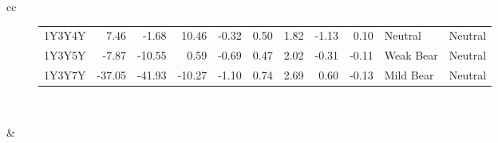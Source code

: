 \documentclass[a4paper,twoside]{report}
\begin{document}
\begin{figure}[htbp]
\begin{tabular}[c]{cc}
\begin{subfigure}[c]{0.5\textwidth}
\begin{adjustbox}{max width=\textwidth}
\begin{tabular}{lrrrrrrrrll}
       1Y3Y4Y &    7.46 &    -1.68 &     10.46 &  -0.32 &  0.50 &      1.82 &  -1.13 &     0.10 &      Neutral &         Neutral \\
       1Y3Y5Y &   -7.87 &   -10.55 &      0.59 &  -0.69 &  0.47 &      2.02 &  -0.31 &    -0.11 &    Weak Bear &         Neutral \\
       1Y3Y7Y &  -37.05 &   -41.93 &    -10.27 &  -1.10 &  0.74 &      2.69 &   0.60 &    -0.13 &    Mild Bear &         Neutral \\
\hline
\end{tabular}
\end{adjustbox}
\end{subfigure}\\
 
 

\begin{subfigure}[c]{0.5\textwidth}
 
 \null\hfill
 \end{subfigure}&
 

\end{tabular}
\end{figure}
\end{document}
